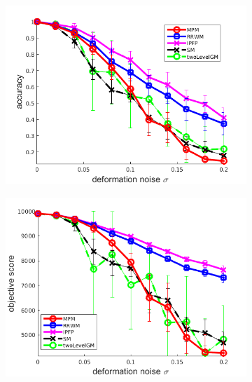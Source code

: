 \begin{figure}
	\begin{subfigure}[b]{0.3\textwidth}
		\centering
		\includegraphics[scale=0.25]{"chapter3/fig/SyntheticTest/descr/Results_v4.3.3/Test2/accuracy_avg10t"} 
	\end{subfigure}
	\begin{subfigure}[b]{0.3\textwidth}
		\centering
		\includegraphics[scale=0.25]{"chapter3/fig/SyntheticTest/descr/Results_v4.3.3/Test2/score_avg10t"} 
	\end{subfigure} 
	\begin{subfigure}[b]{0.3\textwidth}
		\centering

\end{subfigure}
\end{figure}

